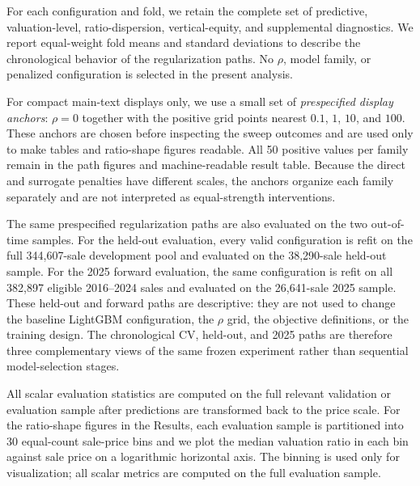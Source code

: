 \documentclass[10pt]{article}
\theoremstyle{definition}
\newcommand{\1}{\mathbf{1}}
\begin{document}
For each configuration and fold, we retain the complete set of predictive,
valuation-level, ratio-dispersion, vertical-equity, and supplemental diagnostics.
We report equal-weight fold means and standard deviations to describe the
chronological behavior of the regularization paths. No $\rho$, model family, or
penalized configuration is selected in the present analysis.

For compact main-text displays only, we use a small set of \emph{prespecified display
anchors}: $\rho=0$ together with the positive grid points nearest $0.1$, $1$, $10$,
and $100$. These anchors are chosen before inspecting the sweep outcomes and are
used only to make tables and ratio-shape figures readable. All 50 positive values
per family remain in the path figures and machine-readable result table. Because the
direct and surrogate penalties have different scales, the anchors organize each
family separately and are not interpreted as equal-strength interventions.

The same prespecified regularization paths are also evaluated on the two out-of-time
samples. For the held-out evaluation, every valid configuration is refit on the full
344,607-sale development pool and evaluated on the 38,290-sale held-out sample. For
the 2025 forward evaluation, the same configuration is refit on all 382,897 eligible
2016--2024 sales and evaluated on the 26,641-sale 2025 sample. These held-out and
forward paths are descriptive: they are not used to change the baseline LightGBM
configuration, the $\rho$ grid, the objective definitions, or the training design.
The chronological CV, held-out, and 2025 paths are therefore three complementary
views of the same frozen experiment rather than sequential model-selection stages.

All scalar evaluation statistics are computed on the full relevant validation or
evaluation sample after predictions are transformed back to the price scale. For
the ratio-shape figures in the Results, each evaluation sample is partitioned into
30 equal-count sale-price bins and we plot the median valuation ratio in each bin
against sale price on a logarithmic horizontal axis. The binning is used only for
visualization; all scalar metrics are computed on the full evaluation sample.
\end{document}
